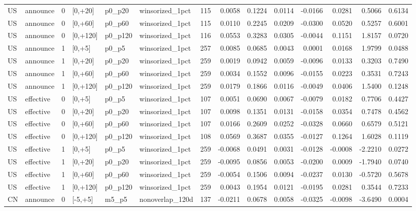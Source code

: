 \begin{tabular}{llrlllrrrrrrrr}
US & announce & 0 & [0,+20] & p0_p20 & winsorized_1pct & 115 & 0.0058 & 0.1224 & 0.0114 & -0.0166 & 0.0281 & 0.5066 & 0.6134 \\
US & announce & 0 & [0,+60] & p0_p60 & winsorized_1pct & 115 & 0.0110 & 0.2245 & 0.0209 & -0.0300 & 0.0520 & 0.5257 & 0.6001 \\
US & announce & 0 & [0,+120] & p0_p120 & winsorized_1pct & 116 & 0.0553 & 0.3283 & 0.0305 & -0.0044 & 0.1151 & 1.8157 & 0.0720 \\
US & announce & 1 & [0,+5] & p0_p5 & winsorized_1pct & 257 & 0.0085 & 0.0685 & 0.0043 & 0.0001 & 0.0168 & 1.9799 & 0.0488 \\
US & announce & 1 & [0,+20] & p0_p20 & winsorized_1pct & 259 & 0.0019 & 0.0942 & 0.0059 & -0.0096 & 0.0133 & 0.3203 & 0.7490 \\
US & announce & 1 & [0,+60] & p0_p60 & winsorized_1pct & 259 & 0.0034 & 0.1552 & 0.0096 & -0.0155 & 0.0223 & 0.3531 & 0.7243 \\
US & announce & 1 & [0,+120] & p0_p120 & winsorized_1pct & 259 & 0.0179 & 0.1866 & 0.0116 & -0.0049 & 0.0406 & 1.5400 & 0.1248 \\
US & effective & 0 & [0,+5] & p0_p5 & winsorized_1pct & 107 & 0.0051 & 0.0690 & 0.0067 & -0.0079 & 0.0182 & 0.7706 & 0.4427 \\
US & effective & 0 & [0,+20] & p0_p20 & winsorized_1pct & 107 & 0.0098 & 0.1351 & 0.0131 & -0.0158 & 0.0354 & 0.7478 & 0.4562 \\
US & effective & 0 & [0,+60] & p0_p60 & winsorized_1pct & 107 & 0.0166 & 0.2609 & 0.0252 & -0.0328 & 0.0660 & 0.6579 & 0.5121 \\
US & effective & 0 & [0,+120] & p0_p120 & winsorized_1pct & 108 & 0.0569 & 0.3687 & 0.0355 & -0.0127 & 0.1264 & 1.6028 & 0.1119 \\
US & effective & 1 & [0,+5] & p0_p5 & winsorized_1pct & 259 & -0.0068 & 0.0491 & 0.0031 & -0.0128 & -0.0008 & -2.2210 & 0.0272 \\
US & effective & 1 & [0,+20] & p0_p20 & winsorized_1pct & 259 & -0.0095 & 0.0856 & 0.0053 & -0.0200 & 0.0009 & -1.7940 & 0.0740 \\
US & effective & 1 & [0,+60] & p0_p60 & winsorized_1pct & 259 & -0.0054 & 0.1506 & 0.0094 & -0.0237 & 0.0130 & -0.5720 & 0.5678 \\
US & effective & 1 & [0,+120] & p0_p120 & winsorized_1pct & 259 & 0.0043 & 0.1954 & 0.0121 & -0.0195 & 0.0281 & 0.3544 & 0.7233 \\
CN & announce & 0 & [-5,+5] & m5_p5 & nonoverlap_120d & 137 & -0.0211 & 0.0678 & 0.0058 & -0.0325 & -0.0098 & -3.6490 & 0.0004 \\

\end{tabular}
